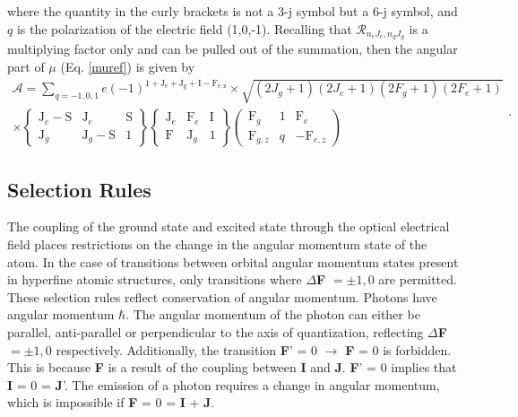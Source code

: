 where the quantity in the curly brackets is not a 3-j symbol but a 6-j symbol, and $q$ is the polarization of the electric field (1,0,-1). Recalling that $\mathcal{R}_{n_e J_e, n_g J_g}$ is a multiplying factor only and can be pulled out of the summation, then the angular part of $\mu$ (Eq. \ref{muref}) is given by
\begin{equation}
\begin{split}
\mathcal{A} = \sum_{q = -1,0,1} e (-1)^{\mathrm{1+J_e+J_g+I-F_{e,z}}}
\times \sqrt{(2J_g+1)(2J_e+1)(2F_g+1)(2F_e+1)}\\
\times \left\lbrace
\begin{matrix}
\mathrm{J}_e-\mathrm{S} & \mathrm{J}_e & \mathrm{S}\\
\mathrm{J}_g & \mathrm{J}_g-\mathrm{S}& 1
\end{matrix}
\right\rbrace
\left\lbrace
\begin{matrix}
\mathrm{J}_e & \mathrm{F}_e & \mathrm{I}\\
\mathrm{F} & \mathrm{J}_g &1
\end{matrix}
\right\rbrace
\left(
\begin{matrix}
\mathrm{F}_g & 1 & \mathrm{F}_e\\
\mathrm{F}_{g,z} & q &-\mathrm{F}_{e,z}
\end{matrix}
\right)
\end{split}.
\end{equation}


\subsection{Selection Rules}
The coupling of the ground state and excited state through the optical electrical field places restrictions on the change in the angular momentum state of the atom. In the case of transitions between orbital angular momentum states present in hyperfine atomic structures, only transitions where $\Delta$\textbf{F}  $=\pm1,0$ are permitted. These selection rules reflect conservation of angular momentum. Photons have angular momentum $\hbar$. The angular momentum of the photon can either be parallel, anti-parallel or perpendicular to the axis of quantization, reflecting $\Delta$\textbf{F}$=\pm1,0$ respectively. Additionally, the transition \textbf{F}' = 0 $\rightarrow$ \textbf{F} = 0 is forbidden. This is because \textbf{F} is a result of the coupling between \textbf{I} and \textbf{J}. \textbf{F}' = 0 implies that \textbf{I} = 0 = \textbf{J}'. The emission of a photon requires a change in angular momentum, which is impossible if \textbf{F} = 0 = \textbf{I} + \textbf{J}.

